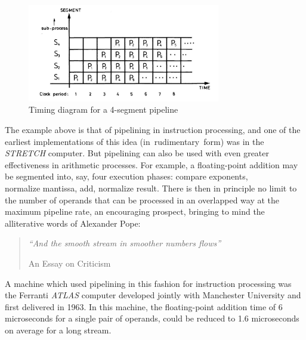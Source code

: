 \documentclass[a4paper,12pt]{article}
\begin{document}
\begin{figure}[h]
  \centering
  \includegraphics[width=0.75\textwidth]{./figure_02}
  \caption{Timing diagram for a 4-segment pipeline}
\end{figure}

   The example above is that of pipelining in instruction processing,
and one of the earliest implementations of this idea
(in~rudimentary~form) was in the \textit{STRETCH} computer. But
pipelining can also be used with even greater effectiveness in
arithmetic processes. For example, a floating-point addition may be
segmented into, say, four execution phases: compare exponents,\\
normalize mantissa, add, normalize result. There is then in principle
no limit to the number of operands that can be processed in an
overlapped way at the maximum pipeline rate, an encouraging prospect,
bringing to mind the alliterative words of Alexander Pope:
\begin{quote}
  {\itshape ``And the smooth stream in smoother numbers flows''
    \begin{flushright} An Essay on Criticism \end{flushright}}
\end{quote}
   A machine which used pipelining in this fashion for instruction
processing was the Ferranti \textit{ATLAS} computer developed
jointly with Manchester University and first delivered in 1963. In
this machine, the floating-point addition time of 6 microseconds
for a single pair of operands, could be reduced to 1.6 microseconds
on average for a long stream.\medskip
\end{document}
